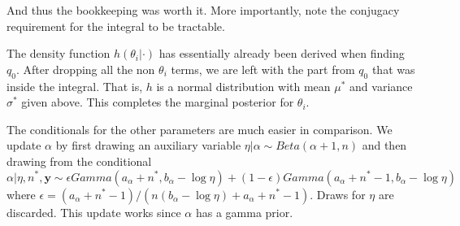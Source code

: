\documentclass[12pt]{article}
\newcommand{\m}[1]{\mathbf{\bm{#1}}}
\begin{document}
\noindent And thus the bookkeeping was worth it. More importantly, note the conjugacy requirement for the integral to be tractable.

The density function $h(\theta_i|\cdot)$ has essentially already been derived when finding $q_0$. After dropping all the non $\theta_i$ terms, we are left with the part from $q_0$ that was inside the integral. That is, $h$ is a normal distribution with mean $\mu^*$ and variance $\sigma^*$ given above. This completes the marginal posterior for $\theta_i$.

The conditionals for the other parameters are much easier in comparison. We update $\alpha$ by first drawing an auxiliary variable $\eta|\alpha\sim Beta(\alpha+1,n)$ and then drawing from the conditional 
\[\alpha|\eta,n^*,\m{y}\sim\epsilon Gamma(a_\alpha+n^*, b_\alpha-\log\eta) + (1-\epsilon)Gamma(a_\alpha+n^*-1,b_\alpha-\log\eta)\]
\noindent where $\epsilon=(a_\alpha+n^*-1)/(n(b_\alpha-\log\eta)+a_\alpha+n^*-1)$. Draws for $\eta$ are discarded. This update works since $\alpha$ has a gamma prior.
\end{document}
